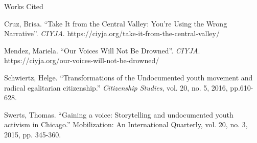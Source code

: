 \documentclass[12pt]{article}
\newcommand{\bibent}{\noindent \hangindent 40pt}
\newenvironment{workscited}{\newpage \begin{center} Works Cited \end{center}}{\newpage }
\begin{document}
\begin{flushleft}
\begin{workscited}

\bibent
Cruz, Brisa. ``Take It from the Central Valley: You're Using the Wrong Narrative''. \textit{CIYJA}. https://ciyja.org/take-it-from-the-central-valley/

\bibent
Mendez, Mariela. ``Our Voices Will Not Be Drowned''. \textit{CIYJA}. https://ciyja.org/our-voices-will-not-be-drowned/

\bibent
Schwiertz, Helge. ``Transformations of the Undocumented youth movement and radical egalitarian citizenship.'' \textit{Citizenship Studies}, vol. 20, no. 5, 2016, pp.610-628.

\bibent
Swerts, Thomas. “Gaining a voice: Storytelling and undocumented youth activism in Chicago.” Mobilization: An International Quarterly, vol. 20, no. 3, 2015, pp. 345-360.



\end{workscited}

\end{flushleft}
\end{document}
